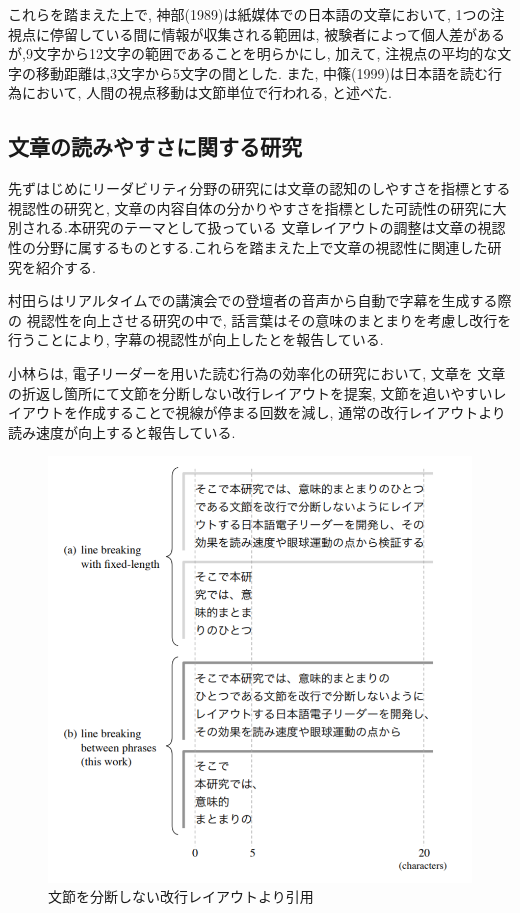 これらを踏まえた上で, 神部(1989)は紙媒体での日本語の文章において, 1つの注視点に停留している間に情報が収集される範囲は,
被験者によって個人差があるが,9文字から12文字の範囲であることを明らかにし, 
加えて, 注視点の平均的な文字の移動距離は,3文字から5文字の間とした.\cite{神部89}
また, 中篠(1999)は日本語を読む行為において, 人間の視点移動は文節単位で行われる, と述べた.\cite{中條99} 

\subsection{文章の読みやすさに関する研究}

先ずはじめにリーダビリティ分野の研究には文章の認知のしやすさを指標とする視認性の研究と,
文章の内容自体の分かりやすさを指標とした可読性の研究に大別される.本研究のテーマとして扱っている
文章レイアウトの調整は文章の視認性の分野に属するものとする.これらを踏まえた上で文章の視認性に関連した研究を紹介する.

村田らはリアルタイムでの講演会での登壇者の音声から自動で字幕を生成する際の
視認性を向上させる研究の中で, 話言葉はその意味のまとまりを考慮し改行を行うことにより, 
字幕の視認性が向上したとを報告している.\cite{村田09} 

小林らは, 電子リーダーを用いた読む行為の効率化の研究において, 文章を
文章の折返し箇所にて文節を分断しない改行レイアウトを提案, 
文節を追いやすいレイアウトを作成することで視線が停まる回数を減し, 
通常の改行レイアウトより読み速度が向上すると報告している.\cite{小林14} 

\begin{figure}[H]
    \centering
    \label{fig:image6}
    \includegraphics[width=0.6\columnwidth]{image/02/img1.png}
    \caption[文節を分断しない改行レイアウト] {文節を分断しない改行レイアウト\protect\cite{小林14}より引用}
\end{figure}

